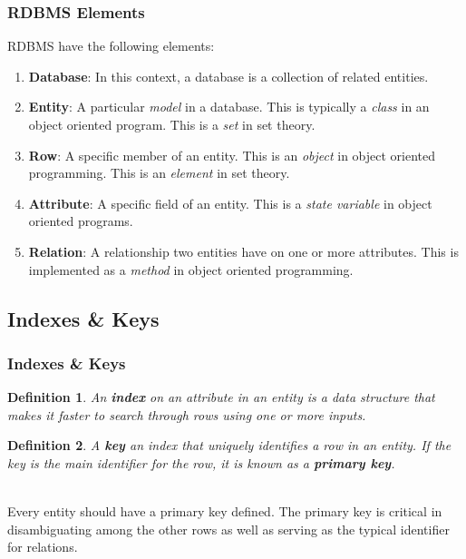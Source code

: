 \documentclass[aspectratio=169]{beamer}
\newtheorem{defn}{Definition}
\begin{document}
\begin{frame}
\frametitle{RDBMS Elements}
RDBMS have the following elements:
\begin{enumerate}
	\item \textbf{Database}: In this context, a database is a collection of related entities.
	\item \textbf{Entity}: A particular \emph{model} in a database. This is typically a \emph{class} in an object oriented program. This is a \emph{set} in set theory.
	\item \textbf{Row}: A specific member of an entity. This is an \emph{object} in object oriented programming. This is an \emph{element} in set theory.
	\item \textbf{Attribute}: A specific field of an entity. This is a \emph{state variable} in object oriented programs.
	\item \textbf{Relation}: A relationship two entities have on one or more attributes. This is implemented as a \emph{method} in object oriented programming.
\end{enumerate}
\end{frame}

\subsection{Indexes \& Keys}
\begin{frame}
\frametitle{Indexes \& Keys}
\begin{defn}
An \textbf{index} on an attribute in an entity is a data structure that makes it faster to search through rows using one or more inputs. 
\end{defn}
\begin{defn}
A \textbf{key} an index that uniquely identifies a row in an entity. If the key is the main identifier for the row, it is known as a \textbf{primary key}.
\end{defn}
\mbox{}\\
Every entity should have a primary key defined. The primary key is critical in disambiguating among the other rows as well as serving as the typical identifier for relations.
\end{frame}
\end{document}
